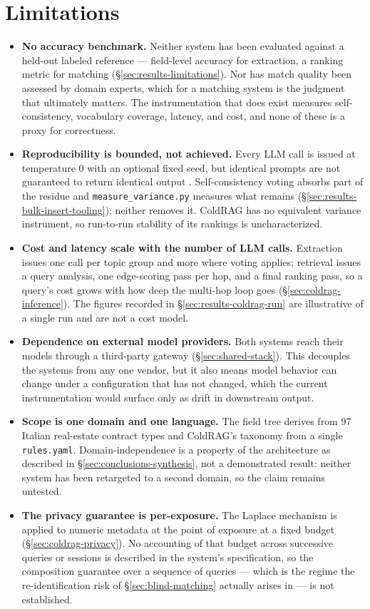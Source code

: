 \section{Limitations}
\label{sec:conclusions-limitations}

\begin{itemize}
  \item \textbf{No accuracy benchmark.} Neither system has been evaluated against a held-out labeled reference — field-level accuracy for extraction, a ranking metric for matching (\S\ref{sec:results-limitations}). Nor has match quality been assessed by domain experts, which for a matching system is the judgment that ultimately matters. The instrumentation that does exist measures self-consistency, vocabulary coverage, latency, and cost, and none of these is a proxy for correctness.
  \item \textbf{Reproducibility is bounded, not achieved.} Every LLM call is issued at temperature 0 with an optional fixed seed, but identical prompts are not guaranteed to return identical output \citep{he2025defeating}. Self-consistency voting absorbs part of the residue and \texttt{measure\_variance.py} measures what remains (\S\ref{sec:results-bulk-insert-tooling}); neither removes it. ColdRAG has no equivalent variance instrument, so run-to-run stability of its rankings is uncharacterized.
  \item \textbf{Cost and latency scale with the number of LLM calls.} Extraction issues one call per topic group and more where voting applies; retrieval issues a query analysis, one edge-scoring pass per hop, and a final ranking pass, so a query's cost grows with how deep the multi-hop loop goes (\S\ref{sec:coldrag-inference}). The figures recorded in \S\ref{sec:results-coldrag-run} are illustrative of a single run and are not a cost model.
  \item \textbf{Dependence on external model providers.} Both systems reach their models through a third-party gateway (\S\ref{sec:shared-stack}). This decouples the systems from any one vendor, but it also means model behavior can change under a configuration that has not changed, which the current instrumentation would surface only as drift in downstream output.
  \item \textbf{Scope is one domain and one language.} The field tree derives from 97 Italian real-estate contract types and ColdRAG's taxonomy from a single \texttt{rules.yaml}. Domain-independence is a property of the architecture as described in \S\ref{sec:conclusions-synthesis}, not a demonstrated result: neither system has been retargeted to a second domain, so the claim remains untested.
  \item \textbf{The privacy guarantee is per-exposure.} The Laplace mechanism is applied to numeric metadata at the point of exposure at a fixed budget (\S\ref{sec:coldrag-privacy}). No accounting of that budget across successive queries or sessions is described in the system's specification, so the composition guarantee over a sequence of queries — which is the regime the re-identification risk of \S\ref{sec:blind-matching} actually arises in — is not established.
\end{itemize}


